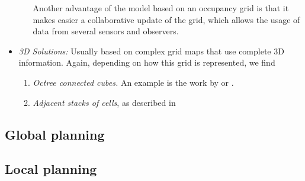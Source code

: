 \begin{itemize}
\begin{enumerate}
   Another advantage of the model based on an occupancy grid is that it makes easier a collaborative update of the grid, which allows the usage of data from several sensors and observers.
  \end{enumerate} 
 \item \emph{3D Solutions:} Usually based on complex grid maps that use complete 3D information. Again, depending on how this grid is represented, we find 
 \begin{enumerate}
   \item \emph{Octree connected cubes.} An example is the work by \cite{wurm2010octomap} or \cite{broggi2013}.
   \item \emph{Adjacent stacks of cells}, as described in \cite{Moravec96robotspatial} 
 \end{enumerate}
\end{itemize}

\subsection{Global planning}\label{ch:chapter00_02_06}

% 
% 
% 



\subsection{Local planning}\label{ch:chapter00_02_03}

